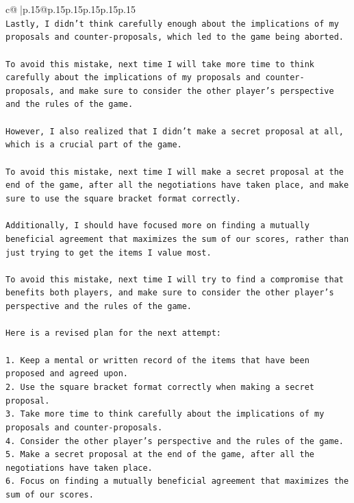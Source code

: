 \documentclass{article}
\begin{document}
{\begin{supertabular}{c@{$\;$}|p{.15\linewidth}@{}p{.15\linewidth}p{.15\linewidth}p{.15\linewidth}p{.15\linewidth}p{.15\linewidth}}
{{{\\ 
\texttt{Lastly, I didn't think carefully enough about the implications of my proposals and counter{-}proposals, which led to the game being aborted.} \\
\\ 
\texttt{To avoid this mistake, next time I will take more time to think carefully about the implications of my proposals and counter{-}proposals, and make sure to consider the other player's perspective and the rules of the game.} \\
\\ 
\texttt{However, I also realized that I didn't make a secret proposal at all, which is a crucial part of the game. } \\
\\ 
\texttt{To avoid this mistake, next time I will make a secret proposal at the end of the game, after all the negotiations have taken place, and make sure to use the square bracket format correctly.} \\
\\ 
\texttt{Additionally, I should have focused more on finding a mutually beneficial agreement that maximizes the sum of our scores, rather than just trying to get the items I value most.} \\
\\ 
\texttt{To avoid this mistake, next time I will try to find a compromise that benefits both players, and make sure to consider the other player's perspective and the rules of the game.} \\
\\ 
\texttt{Here is a revised plan for the next attempt:} \\
\\ 
\texttt{1. Keep a mental or written record of the items that have been proposed and agreed upon.} \\
\texttt{2. Use the square bracket format correctly when making a secret proposal.} \\
\texttt{3. Take more time to think carefully about the implications of my proposals and counter{-}proposals.} \\
\texttt{4. Consider the other player's perspective and the rules of the game.} \\
\texttt{5. Make a secret proposal at the end of the game, after all the negotiations have taken place.} \\
\texttt{6. Focus on finding a mutually beneficial agreement that maximizes the sum of our scores.} \\
}}}
\end{supertabular}}
\end{document}
